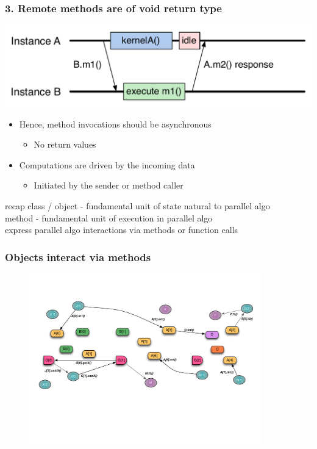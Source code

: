 \begin{frame}
\frametitle{3. Remote methods are of void return type}
  \begin{center}
    \includegraphics[width=\textwidth]{../figures/objectSequenceAsync.pdf}
  \end{center}
  \begin{itemize}
  \item Hence, method invocations should be asynchronous
    \begin{itemize}
    \item No return values
    \end{itemize}
  \item Computations are driven by the incoming data
    \begin{itemize}
    \item Initiated by the sender or method caller
    \end{itemize}
  \end{itemize}
\end{frame}



\begin{frame}
recap
    class / object - fundamental unit of state natural to parallel algo\\
    method - fundamental unit of execution in parallel algo\\
    express parallel algo interactions via methods or function calls
\end{frame}


\begin{frame}
  \frametitle{Objects interact via methods}
  \begin{figure}
    \includegraphics[width=0.9\textwidth]{../figures/progmodel/07-algo-via-objects-methods.pdf}
  \end{figure}
\end{frame}


